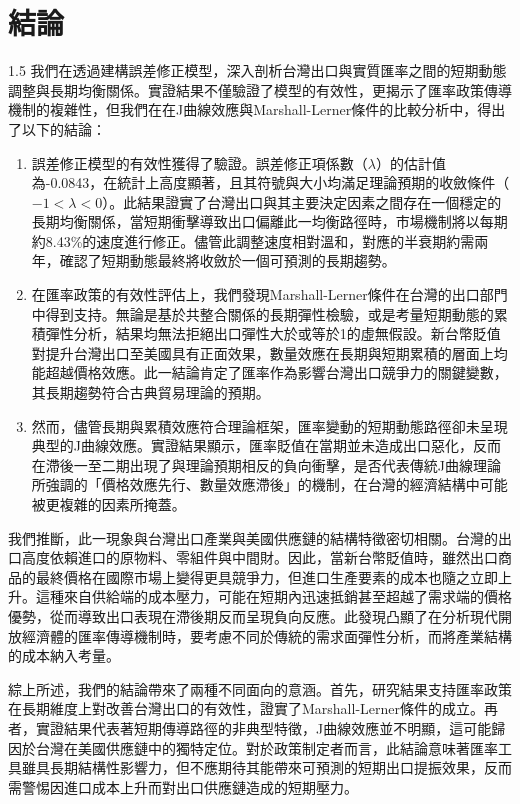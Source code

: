 \documentclass[a4paper,12pt]{article}
\begin{document}
\section{結論}
\begin{spacing}{1.5}
我們在透過建構誤差修正模型，深入剖析台灣出口與實質匯率之間的短期動態調整與長期均衡關係。實證結果不僅驗證了模型的有效性，更揭示了匯率政策傳導機制的複雜性，但我們在在J曲線效應與Marshall-Lerner條件的比較分析中，得出了以下的結論：

\vspace{-0.3cm}
\begin{enumerate}
    \item 誤差修正模型的有效性獲得了驗證。誤差修正項係數（$\lambda$）的估計值為-0.0843，在統計上高度顯著，且其符號與大小均滿足理論預期的收斂條件（$-1 < \lambda < 0$）。此結果證實了台灣出口與其主要決定因素之間存在一個穩定的長期均衡關係，當短期衝擊導致出口偏離此一均衡路徑時，市場機制將以每期約8.43\%的速度進行修正。儘管此調整速度相對溫和，對應的半衰期約需兩年，確認了短期動態最終將收斂於一個可預測的長期趨勢。
    \item 在匯率政策的有效性評估上，我們發現Marshall-Lerner條件在台灣的出口部門中得到支持。無論是基於共整合關係的長期彈性檢驗，或是考量短期動態的累積彈性分析，結果均無法拒絕出口彈性大於或等於1的虛無假設。新台幣貶值對提升台灣出口至美國具有正面效果，數量效應在長期與短期累積的層面上均能超越價格效應。此一結論肯定了匯率作為影響台灣出口競爭力的關鍵變數，其長期趨勢符合古典貿易理論的預期。
    \item 然而，儘管長期與累積效應符合理論框架，匯率變動的短期動態路徑卻未呈現典型的J曲線效應。實證結果顯示，匯率貶值在當期並未造成出口惡化，反而在滯後一至二期出現了與理論預期相反的負向衝擊，是否代表傳統J曲線理論所強調的「價格效應先行、數量效應滯後」的機制，在台灣的經濟結構中可能被更複雜的因素所掩蓋。
\end{enumerate}
我們推斷，此一現象與台灣出口產業與美國供應鏈的結構特徵密切相關。台灣的出口高度依賴進口的原物料、零組件與中間財。因此，當新台幣貶值時，雖然出口商品的最終價格在國際市場上變得更具競爭力，但進口生產要素的成本也隨之立即上升。這種來自供給端的成本壓力，可能在短期內迅速抵銷甚至超越了需求端的價格優勢，從而導致出口表現在滯後期反而呈現負向反應。此發現凸顯了在分析現代開放經濟體的匯率傳導機制時，要考慮不同於傳統的需求面彈性分析，而將產業結構的成本納入考量。

綜上所述，我們的結論帶來了兩種不同面向的意涵。首先，研究結果支持匯率政策在長期維度上對改善台灣出口的有效性，證實了Marshall-Lerner條件的成立。再者，實證結果代表著短期傳導路徑的非典型特徵，J曲線效應並不明顯，這可能歸因於台灣在美國供應鏈中的獨特定位。對於政策制定者而言，此結論意味著匯率工具雖具長期結構性影響力，但不應期待其能帶來可預測的短期出口提振效果，反而需警惕因進口成本上升而對出口供應鏈造成的短期壓力。

\end{spacing}
\end{document}

